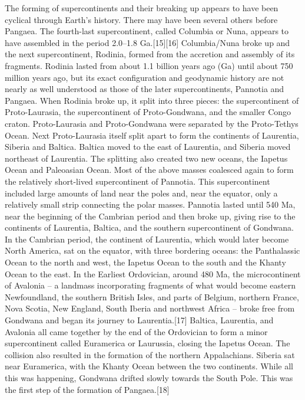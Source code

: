 The forming of supercontinents and their breaking up appears to have been cyclical through Earth's history. There may have been several others before Pangaea. The fourth-last supercontinent, called Columbia or Nuna, appears to have assembled in the period 2.0–1.8 Ga.[15][16] Columbia/Nuna broke up and the next supercontinent, Rodinia, formed from the accretion and assembly of its fragments. Rodinia lasted from about 1.1 billion years ago (Ga) until about 750 million years ago, but its exact configuration and geodynamic history are not nearly as well understood as those of the later supercontinents, Pannotia and Pangaea.
When Rodinia broke up, it split into three pieces: the supercontinent of Proto-Laurasia, the supercontinent of Proto-Gondwana, and the smaller Congo craton. Proto-Laurasia and Proto-Gondwana were separated by the Proto-Tethys Ocean. Next Proto-Laurasia itself split apart to form the continents of Laurentia, Siberia and Baltica. Baltica moved to the east of Laurentia, and Siberia moved northeast of Laurentia. The splitting also created two new oceans, the Iapetus Ocean and Paleoasian Ocean. Most of the above masses coalesced again to form the relatively short-lived supercontinent of Pannotia. This supercontinent included large amounts of land near the poles and, near the equator, only a relatively small strip connecting the polar masses. Pannotia lasted until 540 Ma, near the beginning of the Cambrian period and then broke up, giving rise to the continents of Laurentia, Baltica, and the southern supercontinent of Gondwana.
In the Cambrian period, the continent of Laurentia, which would later become North America, sat on the equator, with three bordering oceans: the Panthalassic Ocean to the north and west, the Iapetus Ocean to the south and the Khanty Ocean to the east. In the Earliest Ordovician, around 480 Ma, the microcontinent of Avalonia – a landmass incorporating fragments of what would become eastern Newfoundland, the southern British Isles, and parts of Belgium, northern France, Nova Scotia, New England, South Iberia and northwest Africa – broke free from Gondwana and began its journey to Laurentia.[17] Baltica, Laurentia, and Avalonia all came together by the end of the Ordovician to form a minor supercontinent called Euramerica or Laurussia, closing the Iapetus Ocean. The collision also resulted in the formation of the northern Appalachians. Siberia sat near Euramerica, with the Khanty Ocean between the two continents. While all this was happening, Gondwana drifted slowly towards the South Pole. This was the first step of the formation of Pangaea.[18]
